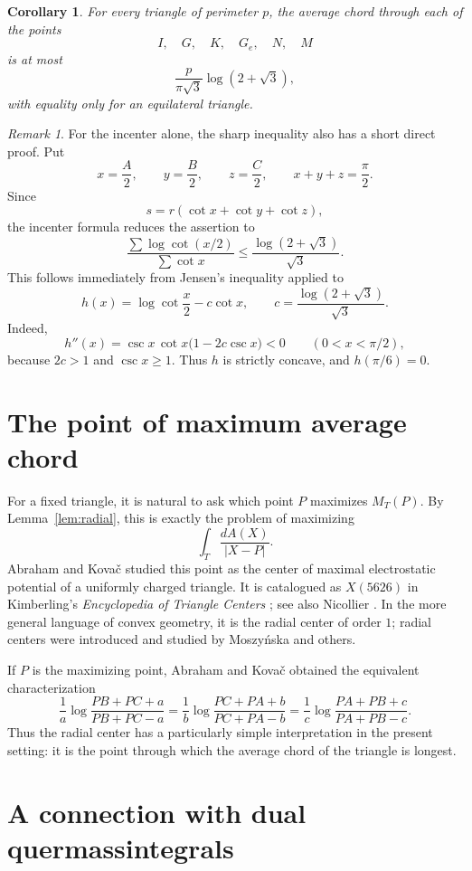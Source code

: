 \documentclass[11pt]{article}
\newtheorem{corollary}[theorem]{Corollary}
\theoremstyle{remark}
\newtheorem{remark}[theorem]{Remark}
\begin{document}
\begin{corollary}
For every triangle of perimeter $p$, the average chord through each
of the points
\[
 I,\quad G,\quad K,\quad G_e,\quad N,\quad M
\]
is at most
\[
 \frac{p}{\pi\sqrt3}\log(2+\sqrt3),
\]
with equality only for an equilateral triangle.
\end{corollary}

\begin{remark}
For the incenter alone, the sharp inequality also has a short direct
proof.  Put
\[
 x=\frac A2,\qquad y=\frac B2,\qquad z=\frac C2,
 \qquad x+y+z=\frac{\pi}{2}.
\]
Since
\[
 s=r(\cot x+\cot y+\cot z),
\]
the incenter formula reduces the assertion to
\[
 \frac{\sum\log\cot(x/2)}{\sum\cot x}
 \le
 \frac{\log(2+\sqrt3)}{\sqrt3}.
\]
This follows immediately from Jensen's inequality applied to
\[
 h(x)=
 \log\cot\frac x2-c\cot x,
 \qquad
 c=\frac{\log(2+\sqrt3)}{\sqrt3}.
\]
Indeed,
\[
 h''(x)=
 \csc x\,\cot x\bigl(1-2c\csc x\bigr)<0
 \qquad (0<x<\pi/2),
\]
because $2c>1$ and $\csc x\ge1$.  Thus $h$ is strictly concave, and
$h(\pi/6)=0$.
\end{remark}

\section{The point of maximum average chord}

For a fixed triangle, it is natural to ask which point $P$ maximizes
$M_T(P)$.  By Lemma~\ref{lem:radial}, this is exactly the problem of
maximizing
\[
 \int_T\frac{dA(X)}{|X-P|}.
\]
Abraham and Kova\v{c} \cite{AbrahamKovac} studied this point as the
center of maximal electrostatic potential of a uniformly charged
triangle.  It is catalogued as $X(5626)$ in Kimberling's
\emph{Encyclopedia of Triangle Centers} \cite{KimberlingETC}; see
also Nicollier \cite{Nicollier}.  In the more general language of convex
geometry, it is the radial center of order $1$; radial centers were
introduced and studied by Moszy\'nska \cite{Moszynska} and others.

If $P$ is the maximizing point, Abraham and Kova\v{c} obtained the
equivalent characterization
\[
 {
 \frac1a\log\frac{PB+PC+a}{PB+PC-a}
 =
 \frac1b\log\frac{PC+PA+b}{PC+PA-b}
 =
 \frac1c\log\frac{PA+PB+c}{PA+PB-c}.
 }
\]
Thus the radial center has a particularly simple interpretation in
the present setting: it is the point through which the average chord
of the triangle is longest.

\section{A connection with dual quermassintegrals}
\end{document}
